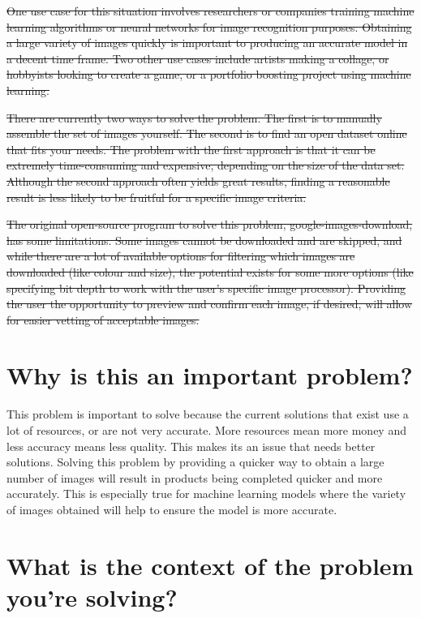 \documentclass{article}
\begin{document}
\sout{One use case for this situation involves researchers or companies training machine learning algorithms or 
neural networks for image recognition purposes. Obtaining a large variety of images quickly is important 
to producing an accurate model in a decent time frame. Two other use cases include artists making a collage, 
or hobbyists looking to create a game, or a portfolio boosting project using machine learning.}

\sout{There are currently two ways to solve the problem. The first is to manually assemble the set of images yourself. 
The second is to find an open dataset online that fits your needs. The problem with the first approach is that 
it can be extremely time-consuming and expensive, depending on the size of the data set. Although the second 
approach often yields great results, finding a reasonable result is less likely to be fruitful for a specific 
image criteria.}

\sout{The original open-source program to solve this problem, google-images-download, has some limitations.
Some images cannot be downloaded and are skipped, and while there are a lot of available options for filtering 
which images are downloaded (like colour and size), the potential exists for some more options (like specifying 
bit depth to work with the user’s specific image processor). Providing the user the opportunity to preview 
and confirm each image, if desired, will allow for easier vetting of acceptable images.}

\section* {Why is this an important problem?}

This problem is important to solve because the current solutions that exist use a lot of resources, or are not 
very accurate. More resources mean more money and less accuracy means less quality. This makes its an issue that 
needs better solutions. Solving this problem by providing a quicker way to obtain a large number of images will 
result in products being completed quicker and more accurately. This is especially true for machine learning models 
where the variety of images obtained will help to ensure the model is more accurate.

\section* {What is the context of the problem you’re solving?}
\end{document}
